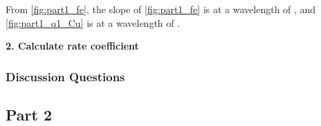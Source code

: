 \documentclass[main.tex]{subfiles}
\begin{document}
From \ref{fig:part1_fe}, the slope of \ref{fig:part1_fe} is
\unskip at a wavelength of , and \ref{fig:part1_q1_Cu} is \unskip at a wavelength of .

\textbf{2. Calculate rate coefficient}

\subsubsection*{Discussion Questions}

\subsection{Part 2}
\end{document}
